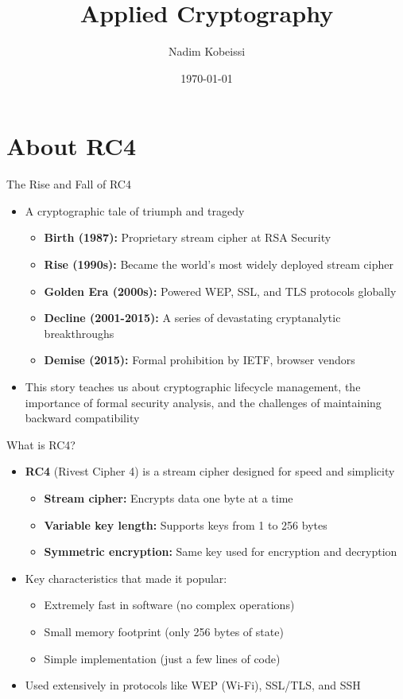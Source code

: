 \documentclass[aspectratio=169, lualatex, handout]{beamer}
\title{Applied Cryptography}
\author{Nadim Kobeissi}
\institute{American University of Beirut}
\date{\today}
\begin{document}
\begin{frame}[plain]
	\titlepage
\end{frame}

\section{About RC4}

\begin{frame}{The Rise and Fall of RC4}
	\begin{itemize}[<+->]
		\item A cryptographic tale of triumph and tragedy
		      \begin{itemize}[<+->]
			      \item \textbf{Birth (1987):} Proprietary stream cipher at RSA Security
			      \item \textbf{Rise (1990s):} Became the world's most widely deployed stream cipher
			      \item \textbf{Golden Era (2000s):} Powered WEP, SSL, and TLS protocols globally
			      \item \textbf{Decline (2001-2015):} A series of devastating cryptanalytic breakthroughs
			      \item \textbf{Demise (2015):} Formal prohibition by IETF, browser vendors
		      \end{itemize}
		\item This story teaches us about cryptographic lifecycle management, the importance of formal security analysis, and the challenges of maintaining backward compatibility
	\end{itemize}
\end{frame}

\begin{frame}{What is RC4?}
	\begin{itemize}[<+->]
		\item \textbf{RC4} (Rivest Cipher 4) is a stream cipher designed for speed and simplicity
		      \begin{itemize}[<+->]
			      \item \textbf{Stream cipher:} Encrypts data one byte at a time
			      \item \textbf{Variable key length:} Supports keys from 1 to 256 bytes
			      \item \textbf{Symmetric encryption:} Same key used for encryption and decryption
		      \end{itemize}
		\item Key characteristics that made it popular:
		      \begin{itemize}[<+->]
			      \item Extremely fast in software (no complex operations)
			      \item Small memory footprint (only 256 bytes of state)
			      \item Simple implementation (just a few lines of code)
		      \end{itemize}
		\item Used extensively in protocols like WEP (Wi-Fi), SSL/TLS, and SSH
	\end{itemize}
\end{frame}
\end{document}
